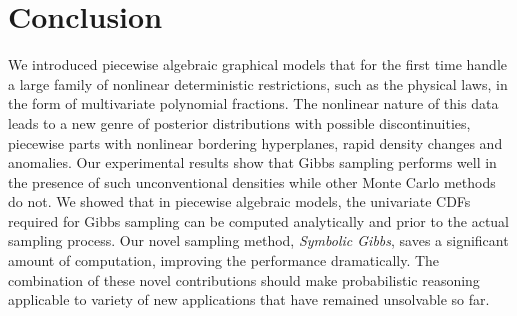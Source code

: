 \documentclass{article}
\begin{document}
\section{Conclusion}
\label{sect:conclusion}

We introduced piecewise algebraic graphical models that for the first time handle a large family of nonlinear deterministic restrictions, such as the physical laws, in the form of multivariate polynomial fractions. The nonlinear nature of this data leads to a new genre of posterior distributions with possible discontinuities, 
piecewise parts with nonlinear bordering hyperplanes, rapid density changes and anomalies. Our experimental results show that Gibbs sampling performs well in the presence of such unconventional densities while other Monte Carlo methods do not. We showed that in piecewise algebraic models, the univariate CDFs required for Gibbs sampling can be computed analytically and prior to the actual sampling process. Our novel sampling method, \emph{Symbolic Gibbs}, saves a significant amount of computation, improving the performance dramatically. The combination of these novel contributions should make probabilistic reasoning applicable to variety of new applications that have remained unsolvable so far.      



\end{document}

